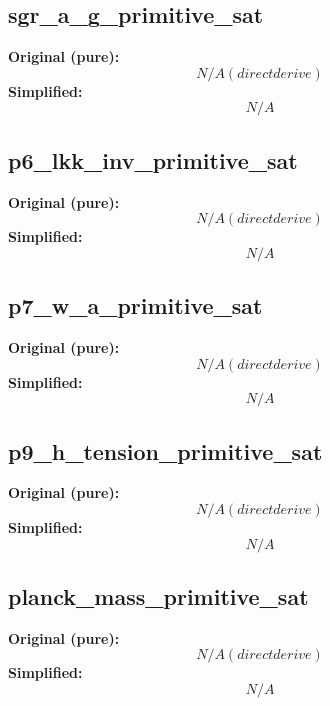 \subsection{sgr_a_g_primitive_sat}
\textbf{Original (pure):}
\begin{equation}
N/A (direct derive)
\end{equation}
\textbf{Simplified:}
\begin{equation}
N/A
\end{equation}

\subsection{p6_lkk_inv_primitive_sat}
\textbf{Original (pure):}
\begin{equation}
N/A (direct derive)
\end{equation}
\textbf{Simplified:}
\begin{equation}
N/A
\end{equation}

\subsection{p7_w_a_primitive_sat}
\textbf{Original (pure):}
\begin{equation}
N/A (direct derive)
\end{equation}
\textbf{Simplified:}
\begin{equation}
N/A
\end{equation}

\subsection{p9_h_tension_primitive_sat}
\textbf{Original (pure):}
\begin{equation}
N/A (direct derive)
\end{equation}
\textbf{Simplified:}
\begin{equation}
N/A
\end{equation}

\subsection{planck_mass_primitive_sat}
\textbf{Original (pure):}
\begin{equation}
N/A (direct derive)
\end{equation}
\textbf{Simplified:}
\begin{equation}
N/A
\end{equation}

